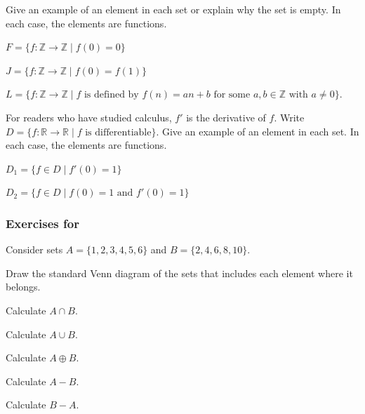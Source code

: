 \begin{exer}[\exerE] %
\label{exer_set_fns}
    Give an example of an element in each set or explain why the set is empty.  In each case, the elements are functions.
        \begin{exerpart}
            \item $F=\{f: \mathbb{Z} \to \mathbb{Z} \mid f(0) = 0\}$  
            \item $J=\{f: \mathbb{Z} \to \mathbb{Z} \mid f(0) = f(1)\}$  
            \item $L = \{f: \mathbb{Z} \to \mathbb{Z} \mid f \text{ is defined by }f(n) = an+b \text{ for some }a,b\in \mathbb{Z} \text{ with } a \neq 0\}$.
        \end{exerpart}
\end{exer}

\begin{exer}[\exerE] %
\label{set_diff_fns}
    For readers who have studied calculus, $f'$ is the derivative of $f$.  Write $D=\{f: \mathbb{R} \to \mathbb{R} \mid f \text{ is differentiable}\}$.  Give an example of an element in each set. In each case, the elements are functions.
        \begin{exerpart}
            \item $D_1=\{ f \in D \mid f'(0) = 1\}$
            \item $D_2=\{ f \in D \mid f(0)=1 \text{ and } f'(0)=1\}$
        \end{exerpart}
\end{exer}


\subsubsection*{Exercises for 
\subsetops}

\begin{exer}[\exerP] %
\label{exer_set_ops_2sets}
    Consider sets $A = \{1, 2, 3, 4, 5, 6\}$ and $B = \{2, 4, 6, 8, 10\}$.
        \begin{exerpart}
            \item Draw the standard Venn diagram of the sets that includes each element where it belongs.
            \item Calculate $A \cap B$.
            \item Calculate $A \cup B$.
            \item Calculate $A \oplus B$.
            \item Calculate $A -B$.
            \item Calculate $B -A$.
        \end{exerpart}     
\end{exer}


